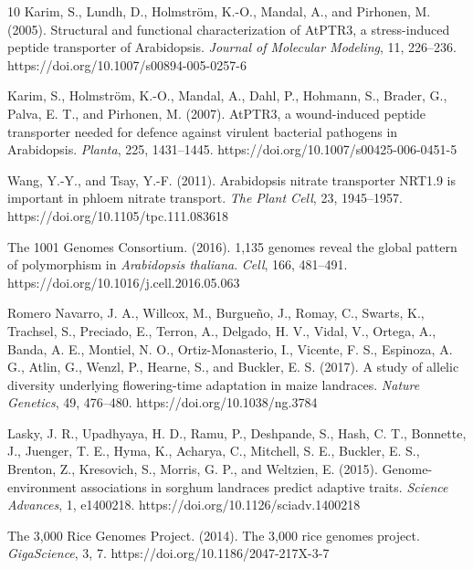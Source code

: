 \documentclass[unnumsec,webpdf,contemporary,large]{oup-authoring-template}%
\theoremstyle{thmstyleone}%
\theoremstyle{thmstyletwo}%
\theoremstyle{thmstylethree}%
\begin{document}
\begin{thebibliography}{10}
Karim, S., Lundh, D., Holmstr{\"o}m, K.-O., Mandal, A., and Pirhonen, M. (2005).
Structural and functional characterization of AtPTR3, a stress-induced peptide transporter of Arabidopsis.
\textit{Journal of Molecular Modeling}, 11, 226--236.
https://doi.org/10.1007/s00894-005-0257-6

Karim, S., Holmstr{\"o}m, K.-O., Mandal, A., Dahl, P., Hohmann, S., Brader, G., Palva, E. T., and Pirhonen, M. (2007).
AtPTR3, a wound-induced peptide transporter needed for defence against virulent bacterial pathogens in Arabidopsis.
\textit{Planta}, 225, 1431--1445.
https://doi.org/10.1007/s00425-006-0451-5

Wang, Y.-Y., and Tsay, Y.-F. (2011).
Arabidopsis nitrate transporter NRT1.9 is important in phloem nitrate transport.
\textit{The Plant Cell}, 23, 1945--1957.
https://doi.org/10.1105/tpc.111.083618

The 1001 Genomes Consortium. (2016).
1,135 genomes reveal the global pattern of polymorphism in \textit{Arabidopsis thaliana}.
\textit{Cell}, 166, 481--491.
https://doi.org/10.1016/j.cell.2016.05.063

Romero Navarro, J. A., Willcox, M., Burgue{\~n}o, J., Romay, C., Swarts, K., Trachsel, S., Preciado, E., Terron, A., Delgado, H. V., Vidal, V., Ortega, A., Banda, A. E., Montiel, N. O., Ortiz-Monasterio, I., Vicente, F. S., Espinoza, A. G., Atlin, G., Wenzl, P., Hearne, S., and Buckler, E. S. (2017).
A study of allelic diversity underlying flowering-time adaptation in maize landraces.
\textit{Nature Genetics}, 49, 476--480.
https://doi.org/10.1038/ng.3784

Lasky, J. R., Upadhyaya, H. D., Ramu, P., Deshpande, S., Hash, C. T., Bonnette, J., Juenger, T. E., Hyma, K., Acharya, C., Mitchell, S. E., Buckler, E. S., Brenton, Z., Kresovich, S., Morris, G. P., and Weltzien, E. (2015).
Genome-environment associations in sorghum landraces predict adaptive traits.
\textit{Science Advances}, 1, e1400218.
https://doi.org/10.1126/sciadv.1400218

The 3,000 Rice Genomes Project. (2014).
The 3,000 rice genomes project.
\textit{GigaScience}, 3, 7.
https://doi.org/10.1186/2047-217X-3-7


\end{thebibliography}
\end{document}
